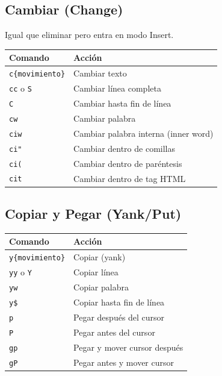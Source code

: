 \documentclass[
  doc,
  floatsintext,
  longtable,
  a4paper,
  nolmodern,
  notxfonts,
  notimes,
  12pt,
  colorlinks=true,linkcolor=blue,citecolor=blue,urlcolor=blue]{apa7}
\newcounter{none} %
\begin{document}
\subsection{Cambiar (Change)}\label{cambiar-change}

Igual que eliminar pero entra en modo Insert.

{\def\LTcaptype{none} %
\begin{longtable}[]{@{}ll@{}}
\toprule\noalign{}
Comando & Acción \\
\midrule\noalign{}
\endhead
\bottomrule\noalign{}
\endlastfoot
\texttt{c\{movimiento\}} & Cambiar texto \\
\texttt{cc} o \texttt{S} & Cambiar línea completa \\
\texttt{C} & Cambiar hasta fin de línea \\
\texttt{cw} & Cambiar palabra \\
\texttt{ciw} & Cambiar palabra interna (inner word) \\
\texttt{ci"} & Cambiar dentro de comillas \\
\texttt{ci(} & Cambiar dentro de paréntesis \\
\texttt{cit} & Cambiar dentro de tag HTML \\
\end{longtable}
}

\subsection{Copiar y Pegar (Yank/Put)}\label{copiar-y-pegar-yankput}

{\def\LTcaptype{none} %
\begin{longtable}[]{@{}ll@{}}
\toprule\noalign{}
Comando & Acción \\
\midrule\noalign{}
\endhead
\bottomrule\noalign{}
\endlastfoot
\texttt{y\{movimiento\}} & Copiar (yank) \\
\texttt{yy} o \texttt{Y} & Copiar línea \\
\texttt{yw} & Copiar palabra \\
\texttt{y\$} & Copiar hasta fin de línea \\
\texttt{p} & Pegar después del cursor \\
\texttt{P} & Pegar antes del cursor \\
\texttt{gp} & Pegar y mover cursor después \\
\texttt{gP} & Pegar antes y mover cursor \\
\end{longtable}
}
\end{document}
